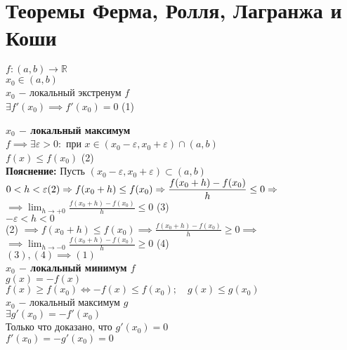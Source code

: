     \section{Теоремы Ферма, Ролля, Лагранжа и Коши}
    \begin{theorem}
    $f: (a,b) \to \mathbb{R}$ \\
    $x_0 \in (a,b)$ \\
    $x_0$ $-$ локальный экстренум $f$\\
    $\exists f'(x_0) \implies f'(x_0)=0$ (1)
    \end{theorem}
    \begin{replacementproof}
        \textbf{$x_0$ $-$ локальный максимум}\\
        $f \implies \exists \varepsilon >0:$ при $x \in (x_0-\varepsilon, x_0+\varepsilon)\cap (a,b)$ \\
        $f(x)\le f(x_0)$ (2)\\
        \textbf{Пояснение:} Пусть $(x_0-\varepsilon, x_0+\varepsilon) \subset (a,b)$ \\
        $0< h <\varepsilon \\ (2)\implies f(x_0+h) \le f(x_0) \implies \displaystyle\frac{f(x_0+h)-f(x_0)}{h}\le 0 \implies$\\
        $\implies \displaystyle\lim_{h \to +0} \displaystyle\frac{f(x_0+h)-f(x_0)}{h}\le 0$ (3)\\
        $-\varepsilon<h<0$\\
        (2) $\implies f(x_0+h)\le f(x_0) \implies \displaystyle\frac{f(x_0+h)-f(x_0)}{h}\ge 0 \implies$\\
        $\implies \displaystyle\lim_{h \to -0} \displaystyle\frac{f(x_0+h)-f(x_0)}{h}\ge 0$ (4)\\
        $(3),(4) \implies (1)$\\
    
        \textbf{$x_0$ $-$ локальный минимум $f$}\\
         $g(x)=-f(x)$ \\
         $f(x) \ge f(x_0) \iff -f(x) \le f(x_0); \quad g(x) \le g(x_0)$ \\
         $x_0$ $-$ локальный максимум $g$\\
          $\exists g'(x_0)=-f'(x_0)$ \\
          Только что доказано, что $g'(x_0)=0$ \\
          $f'(x_0)=-g'(x_0)=0$
    \end{replacementproof}
    
    

